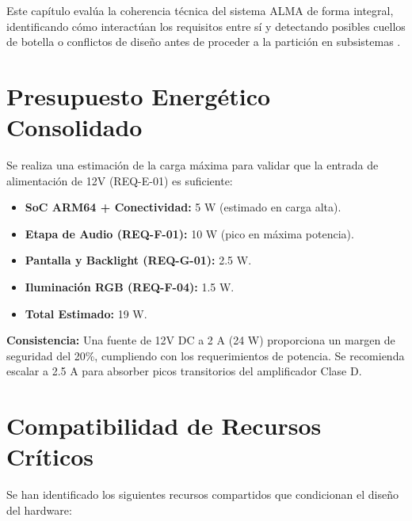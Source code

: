 \documentclass[%
	paper=a4,
	twoside=false,
	parskip=half,
	chapterprefix=false,
	10pt,
	headings=normal,
	bibliography=totoc,
	listof=totoc,
	titlepage=on,
	captions=tableabove,
	draft=false,
]{scrbook}%
\begin{document}
Este capítulo evalúa la coherencia técnica del sistema ALMA de forma integral, identificando cómo interactúan los requisitos entre sí y detectando posibles cuellos de botella o conflictos de diseño antes de proceder a la partición en subsistemas \cite{guia_entregable2}.

\section{Presupuesto Energético Consolidado}

Se realiza una estimación de la carga máxima para validar que la entrada de alimentación de 12V (REQ-E-01) es suficiente:

\begin{itemize}
    \item \textbf{SoC ARM64 + Conectividad:} 5 W (estimado en carga alta).
    \item \textbf{Etapa de Audio (REQ-F-01):} 10 W (pico en máxima potencia).
    \item \textbf{Pantalla y Backlight (REQ-G-01):} 2.5 W.
    \item \textbf{Iluminación RGB (REQ-F-04):} 1.5 W.
    \item \textbf{Total Estimado:} 19 W.
\end{itemize}

\textbf{Consistencia:} Una fuente de 12V DC a 2 A (24 W) proporciona un margen de seguridad del 20\%, cumpliendo con los requerimientos de potencia. Se recomienda escalar a 2.5 A para absorber picos transitorios del amplificador Clase D.

\section{Compatibilidad de Recursos Críticos}

Se han identificado los siguientes recursos compartidos que condicionan el diseño del hardware:
\end{document}
